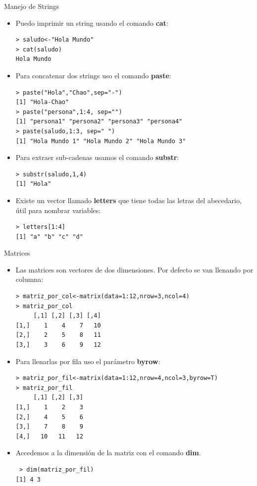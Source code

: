 \documentclass[handout]{beamer}
\begin{document}
\begin{frame}[fragile]{Manejo de Strings}
\scriptsize{
 \begin{itemize}
  \item Puedo imprimir un string usando el comando \textbf{cat}:
\begin{verbatim}
> saludo<-"Hola Mundo"
> cat(saludo)
Hola Mundo
\end{verbatim}

\item Para concatenar dos strings uso el comando \textbf{paste}:
\begin{verbatim}
> paste("Hola","Chao",sep="-")
[1] "Hola-Chao"
> paste("persona",1:4, sep="")
[1] "persona1" "persona2" "persona3" "persona4"
> paste(saludo,1:3, sep=" ")
[1] "Hola Mundo 1" "Hola Mundo 2" "Hola Mundo 3" 
\end{verbatim}

\item Para extraer sub-cadenas usamos el comando \textbf{substr}:
\begin{verbatim}
> substr(saludo,1,4)
[1] "Hola" 
\end{verbatim}

\item Existe un vector llamado \textbf{letters} que tiene todas las letras del abecedario, útil para nombrar variables:
\begin{verbatim}
> letters[1:4]
[1] "a" "b" "c" "d" 
\end{verbatim}


 \end{itemize}

 }
\end{frame}


\begin{frame}[fragile]{Matrices}
\scriptsize{
 \begin{itemize}
  \item Las matrices son vectores de dos dimensiones. Por defecto se van llenando por columna:
 \begin{verbatim}
> matriz_por_col<-matrix(data=1:12,nrow=3,ncol=4)
> matriz_por_col
     [,1] [,2] [,3] [,4]
[1,]    1    4    7   10
[2,]    2    5    8   11
[3,]    3    6    9   12 
 \end{verbatim}
 \item Para llenarlas por fila uso el parámetro \textbf{byrow}:
 \begin{verbatim}
> matriz_por_fil<-matrix(data=1:12,nrow=4,ncol=3,byrow=T)
> matriz_por_fil
     [,1] [,2] [,3]
[1,]    1    2    3
[2,]    4    5    6
[3,]    7    8    9
[4,]   10   11   12  
 \end{verbatim}

 \item Accedemos a la dimensión de la matriz con el comando \textbf{dim}.
 \begin{verbatim}
 > dim(matriz_por_fil)
[1] 4 3 
 \end{verbatim}

 \end{itemize} 
 }
\end{frame}
\end{document}
